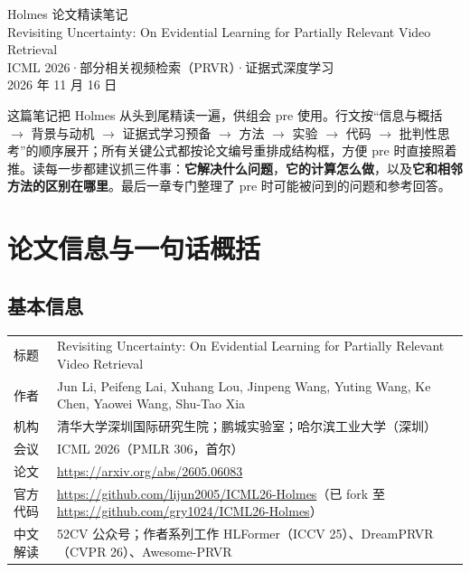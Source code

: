 \documentclass[11pt,a4paper,UTF8,fontset=windows]{ctexart}
\newcommand{\term}[1]{\textbf{#1}}
\begin{document}
\thispagestyle{fancy}
\begin{center}
  {\heiti{}\color{ink}Holmes 论文精读笔记}\\[1.1em]
  {\color{inkgray}Revisiting Uncertainty: On Evidential Learning for Partially Relevant Video Retrieval}\\[0.7em]
  {\color{inkgray}ICML 2026\quad·\quad 部分相关视频检索（PRVR）\quad·\quad 证据式深度学习}\\[1.4em]
  {\color{inkgray}2026 年 11 月 16 日}
\end{center}
\vspace{0.4em}

\tableofcontents
\vspace{0.4em}

\noindent 这篇笔记把 Holmes 从头到尾精读一遍，供组会 pre 使用。行文按“信息与概括 $\rightarrow$ 背景与动机 $\rightarrow$ 证据式学习预备 $\rightarrow$ 方法 $\rightarrow$ 实验 $\rightarrow$ 代码 $\rightarrow$ 批判性思考”的顺序展开；所有关键公式都按论文编号重排成结构框，方便 pre 时直接照着推。读每一步都建议抓三件事：\term{它解决什么问题}，\term{它的计算怎么做}，以及\term{它和相邻方法的区别在哪里}。最后一章专门整理了 pre 时可能被问到的问题和参考回答。

\section{论文信息与一句话概括}

\subsection{基本信息}

\begin{table}[h]
\centering
\small
\begin{tabular}{@{}ll@{}}
\toprule
标题 & Revisiting Uncertainty: On Evidential Learning for Partially Relevant Video Retrieval \\
作者 & Jun Li, Peifeng Lai, Xuhang Lou, Jinpeng Wang, Yuting Wang, Ke Chen, Yaowei Wang, Shu-Tao Xia \\
机构 & 清华大学深圳国际研究生院；鹏城实验室；哈尔滨工业大学（深圳） \\
会议 & ICML 2026（PMLR 306，首尔） \\
论文 & \url{https://arxiv.org/abs/2605.06083} \\
官方代码 & \url{https://github.com/lijun2005/ICML26-Holmes}（已 fork 至 \url{https://github.com/gry1024/ICML26-Holmes}） \\
中文解读 & 52CV 公众号；作者系列工作 HLFormer（ICCV 25）、DreamPRVR（CVPR 26）、Awesome-PRVR \\
\bottomrule
\end{tabular}
\end{table}
\end{document}
